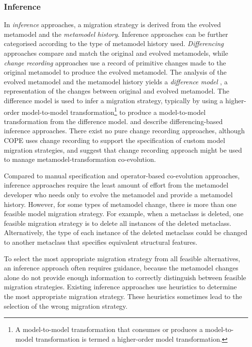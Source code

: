 \subsubsection{Inference}
\label{subsec:inference}
\label{subsec:metamodel_matching}
In \emph{inference} approaches, a migration strategy is derived from the evolved metamodel and the \emph{metamodel history}. Inference approaches can be further categorised according to the type of metamodel history used. \emph{Differencing} approaches compare and match the original and evolved metamodels, while \emph{change recording} approaches use a record of primitive changes made to the original metamodel to produce the evolved metamodel. The analysis of the evolved metamodel and the metamodel history yields a \emph{difference model} \cite{cicchetti08automating}, a representation of the changes between original and evolved metamodel. The difference model is used to infer a migration strategy, typically by using a higher-order model-to-model transformation\footnote{A model-to-model transformation that consumes or produces a model-to-model transformation is termed a higher-order model transformation.} to produce a model-to-model transformation from the difference model. \cite{cicchetti08automating} and \cite{garces09managing} describe differencing-based inference approaches. There exist no pure change recording approaches, although COPE \cite{herrmannsdoerfer09cope} uses change recording to support the specification of custom model migration strategies, and \cite{mendez10towards} suggest that change recording approach might be used to manage metamodel-transformation co-evolution.

Compared to manual specification and operator-based co-evolution approaches, inference approaches require the least amount of effort from the metamodel developer who needs only to evolve the metamodel and provide a metamodel history. However, for some types of metamodel change, there is more than one feasible model migration strategy. For example, when a metaclass is deleted, one feasible migration strategy is to delete all instances of the deleted metaclass. Alternatively, the type of each instance of the deleted metaclass could be changed to another metaclass that specifies equivalent structural features.

To select the most appropriate migration strategy from all feasible alternatives, an inference approach often requires guidance, because the metamodel changes alone do not provide enough information to correctly distinguish between feasible migration strategies. Existing inference approaches use heuristics to determine the most appropriate migration strategy. These heuristics sometimes lead to the selection of the wrong migration strategy.

